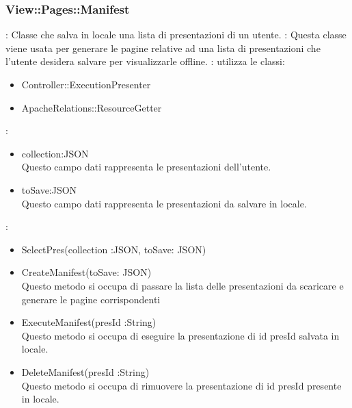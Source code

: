 \subsubsection{View::Pages::Manifest}{
	\textbf{\descrizione}: Classe che salva in locale una lista di presentazioni di un utente.
	\textbf{\utilizzo}: Questa classe viene usata per generare le pagine relative ad una lista di presentazioni che l'utente desidera salvare per visualizzarle offline.
	\textbf{\relazioni}: utilizza le classi:
		\begin{itemize}
		\item Controller::ExecutionPresenter
		\item ApacheRelations::ResourceGetter
		\end{itemize}
	\textbf{\attributi}: 
		\begin{itemize}
		\item collection:JSON \\Questo campo dati rappresenta le presentazioni dell'utente. 
		\item toSave:JSON \\Questo campo dati rappresenta le presentazioni da salvare in locale.
		\end{itemize}
	\textbf{\metodi}:
		\begin{itemize}
		\item SelectPres(collection :JSON, toSave: JSON)
		\item CreateManifest(toSave: JSON) \\Questo metodo si occupa di passare la lista delle presentazioni da scaricare e generare le pagine corrispondenti
		\item ExecuteManifest(presId :String) \\Questo metodo si occupa di eseguire la presentazione di id presId salvata in locale.
		\item DeleteManifest(presId :String) \\Questo metodo si occupa di rimuovere la presentazione di id presId presente in locale.
		\end{itemize}
		}
		
